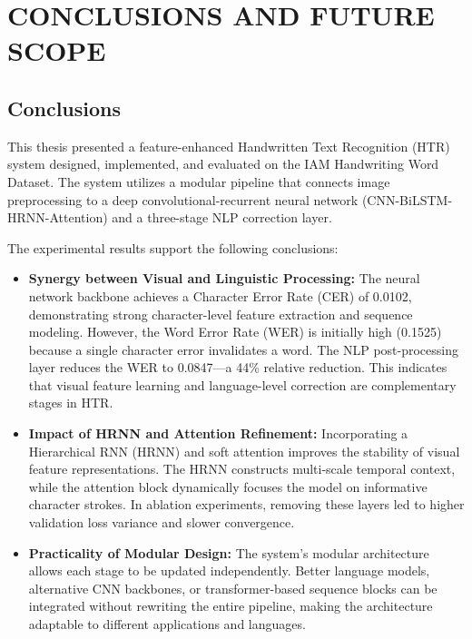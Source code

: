 
\chapter{CONCLUSIONS AND FUTURE SCOPE}
\label{ch:conclusions}

\section{Conclusions}
This thesis presented a feature-enhanced Handwritten Text Recognition (HTR) system designed, implemented, and evaluated on the IAM Handwriting Word Dataset. The system utilizes a modular pipeline that connects image preprocessing to a deep convolutional-recurrent neural network (CNN-BiLSTM-HRNN-Attention) and a three-stage NLP correction layer.

The experimental results support the following conclusions:
\begin{itemize}
    \item \textbf{Synergy between Visual and Linguistic Processing:} The neural network backbone achieves a Character Error Rate (CER) of 0.0102, demonstrating strong character-level feature extraction and sequence modeling. However, the Word Error Rate (WER) is initially high (0.1525) because a single character error invalidates a word. The NLP post-processing layer reduces the WER to 0.0847—a 44\% relative reduction. This indicates that visual feature learning and language-level correction are complementary stages in HTR.
    \item \textbf{Impact of HRNN and Attention Refinement:} Incorporating a Hierarchical RNN (HRNN) and soft attention improves the stability of visual feature representations. The HRNN constructs multi-scale temporal context, while the attention block dynamically focuses the model on informative character strokes. In ablation experiments, removing these layers led to higher validation loss variance and slower convergence.
    \item \textbf{Practicality of Modular Design:} The system's modular architecture allows each stage to be updated independently. Better language models, alternative CNN backbones, or transformer-based sequence blocks can be integrated without rewriting the entire pipeline, making the architecture adaptable to different applications and languages.
\end{itemize}

